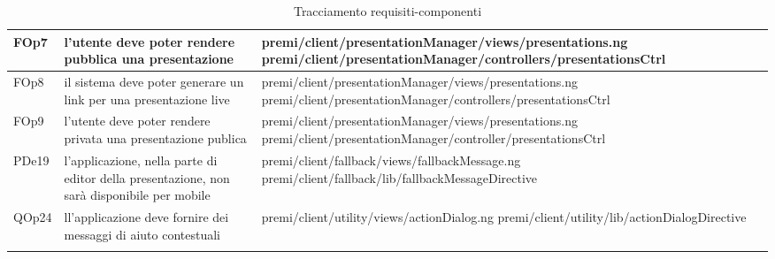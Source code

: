 \begin{longtable}{|l|p{5cm}|p{7cm}|}
\hline
FOp7 & l'utente deve poter rendere pubblica una presentazione & \hspace{0pt}premi/client/presentationManager/views/presentations.ng \linebreak \linebreak premi/client/presentationManager/controllers/presentationsCtrl \\
\hline
FOp8 & il sistema deve poter generare un link per una presentazione live & \hspace{0pt}premi/client/presentationManager/views/presentations.ng \linebreak \linebreak premi/client/presentationManager/controllers/presentationsCtrl \\
\hline
FOp9 & l'utente deve poter rendere privata una presentazione publica & \hspace{0pt}premi/client/presentationManager/views/presentations.ng \linebreak \linebreak premi/client/presentationManager/controller/presentationsCtrl \\
\hline
PDe19 & l'applicazione, nella parte
di editor della presentazione, non sarà disponibile per
mobile & \hspace{0pt}premi/client/fallback/views/fallbackMessage.ng \linebreak \linebreak premi/client/fallback/lib/fallbackMessageDirective \\
\hline
QOp24 & ll'applicazione deve fornire dei messaggi di aiuto
contestuali & \hspace{0pt}premi/client/utility/views/actionDialog.ng \linebreak \linebreak premi/client/utility/lib/actionDialogDirective \\
\hline
\caption{Tracciamento requisiti-componenti}
\end{longtable}